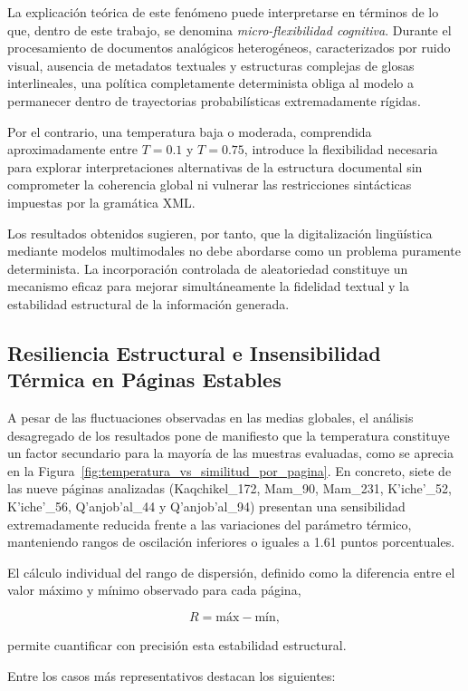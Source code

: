 La explicación teórica de este fenómeno puede interpretarse en términos de lo que, dentro de este trabajo, se denomina \textit{micro-flexibilidad cognitiva}. Durante el procesamiento de documentos analógicos heterogéneos, caracterizados por ruido visual, ausencia de metadatos textuales y estructuras complejas de glosas interlineales, una política completamente determinista obliga al modelo a permanecer dentro de trayectorias probabilísticas extremadamente rígidas.

Por el contrario, una temperatura baja o moderada, comprendida aproximadamente entre \(T=0.1\) y \(T=0.75\), introduce la flexibilidad necesaria para explorar interpretaciones alternativas de la estructura documental sin comprometer la coherencia global ni vulnerar las restricciones sintácticas impuestas por la gramática XML.

Los resultados obtenidos sugieren, por tanto, que la digitalización lingüística mediante modelos multimodales no debe abordarse como un problema puramente determinista. La incorporación controlada de aleatoriedad constituye un mecanismo eficaz para mejorar simultáneamente la fidelidad textual y la estabilidad estructural de la información generada.


\subsection{Resiliencia Estructural e Insensibilidad Térmica en Páginas Estables}

A pesar de las fluctuaciones observadas en las medias globales, el análisis desagregado de los resultados pone de manifiesto que la temperatura constituye un factor secundario para la mayoría de las muestras evaluadas, como se aprecia en la Figura~\ref{fig:temperatura_vs_similitud_por_pagina}. En concreto, siete de las nueve páginas analizadas (Kaqchikel\_172, Mam\_90, Mam\_231, K'iche'\_52, K'iche'\_56, Q'anjob'al\_44 y Q'anjob'al\_94) presentan una sensibilidad extremadamente reducida frente a las variaciones del parámetro térmico, manteniendo rangos de oscilación inferiores o iguales a 1.61 puntos porcentuales.

El cálculo individual del rango de dispersión, definido como la diferencia entre el valor máximo y mínimo observado para cada página,

\[
R = \text{máx} - \text{mín},
\]

permite cuantificar con precisión esta estabilidad estructural.

Entre los casos más representativos destacan los siguientes:

